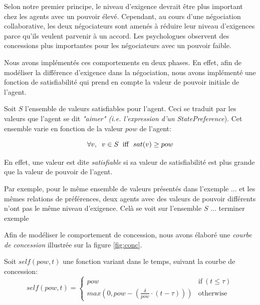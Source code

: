 			Selon notre premier principe, le niveau d'exigence devrait être plus important chez les agents avec un pouvoir élevé. Cependant, au cours d'une négociation collaborative, les deux négociateurs sont amenés à réduire leur niveau d'exigences parce qu'ils veulent parvenir à un accord. Les psychologues observent des concessions plus importantes pour les négociateurs avec un pouvoir faible. 
			
			Nous avons implémentés ces comportements en deux phases. En effet, afin de modéliser la différence d'exigence dans la négociation, nous avons implémenté une fonction de satisfiabilité qui prend en compte la valeur de pouvoir initiale de l'agent. 
			
			Soit $S$ l'ensemble de valeurs satisfiables pour l'agent. Ceci se traduit par les valeurs que l'agent se dit \textit{"aimer" (i.e. l'expression d'un } \emph{StatePreference}). Cet ensemble varie en fonction de la valeur $pow$ de l'agent:
			
			\begin{equation}
			\forall v,\hspace{2mm} v\in S\hspace{2mm}\mathrm{iff}\hspace{2mm}sat(v) \geq pow
			\end{equation}
			
			En effet, une valeur est dite \textit{satisfiable} si sa valeur de satisfiabilité est plus grande que la valeur de pouvoir de l'agent.
			
			Par exemple, pour le même ensemble de valeurs présentés dans l'exemple ... et les mêmes relations de préférences, deux agents avec des valeurs de pouvoir différents n'ont pas le même niveau d'exigence. Celà se voit sur l'ensemble $S$ ... terminer exemple
			
			Afin de modéliser le comportement de concession, nous avons élaboré une \emph {courbe de concession} illustrée sur la figure \ref{fig:conc}. 
		
			Soit $ self (pow, t) $ une fonction variant dans le temps, suivant la courbe de concession:
				\begin{equation}
				self(pow, t) = \left\{\begin{array}{ll}
				pow & \mathrm{if\ } (t \leq \tau)\\
				max(0, pow - (\frac{\delta}{pow} \cdot (t - \tau))) & \mathrm{otherwise}
				\end{array}\right.
				\end{equation}
		

